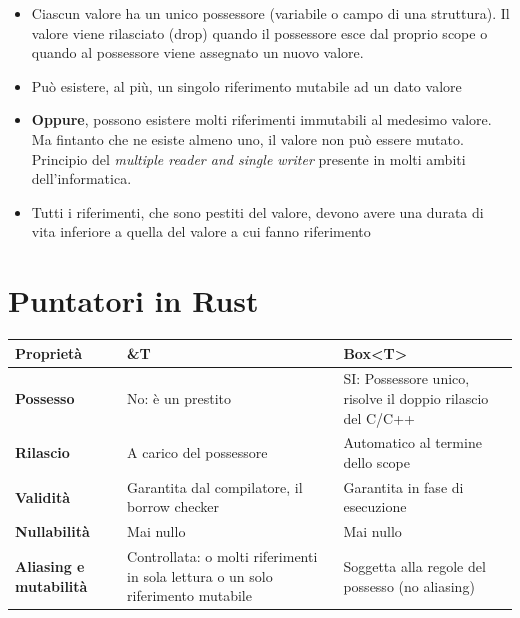 \begin{itemize}
  \item Ciascun valore ha un unico possessore (variabile o campo di una struttura). Il valore viene rilasciato (drop) quando il possessore esce dal proprio scope o quando al possessore
        viene assegnato un nuovo valore.
  \item Può esistere, al più, un singolo riferimento mutabile ad un dato valore

  \item \textbf{Oppure}, possono esistere molti riferimenti immutabili al medesimo valore. Ma fintanto che ne esiste almeno uno, il valore non può essere mutato. Principio del \textit{multiple reader and single writer} presente in molti ambiti dell'informatica.

  \item Tutti i riferimenti, che sono pestiti del valore, devono avere una durata di vita inferiore a quella del valore a cui
        fanno riferimento

\end{itemize}

\section{Puntatori in Rust}

\begin{table}[H]
  \renewcommand{\arraystretch}{1.5}
  \centering
  \begin{tabular}{>{\bfseries}l p{4.7cm} p{4.7cm}}
    \hline
    \textbf{Proprietà}     & \textbf{\&T}                                                                    & \textbf{Box<T>}                                            \\
    \hline
    Possesso               & No: è un prestito                                                               & SI: Possessore unico, risolve il doppio rilascio del C/C++ \\
    Rilascio               & A carico del possessore                                                         & Automatico al termine dello scope                          \\
    Validità               & Garantita dal compilatore, il borrow checker                                    & Garantita in fase di esecuzione                            \\
    Nullabilità            & Mai nullo                                                                       & Mai nullo                                                  \\
    Aliasing  e mutabilità & Controllata: o molti riferimenti in sola lettura o un solo riferimento mutabile & Soggetta alla regole del possesso (no aliasing)            \\

    \hline
  \end{tabular}
\end{table}


